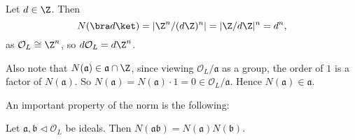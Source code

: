 \documentclass[a4paper]{article}
\begin{document}
\begin{eg}
  Let $d \in \Z$. Then
  \[
    N(\bra d\ket) = |\Z^n/(d\Z)^n| = |\Z/d\Z|^n = d^n,
  \]
  as $\mathcal{O}_L\cong \Z^n$, so $d\mathcal{O}_L = d\Z^n$.
\end{eg}
Also note that $N(\mathfrak{a}) \in \mathfrak{a} \cap \Z$, since viewing $\mathcal{O}_L/\mathfrak{a}$ as a group, the order of $1$ is a factor of $N(\mathfrak{a})$. So $N(\mathfrak{a}) = N(\mathfrak{a}) \cdot 1 = 0 \in \mathcal{O}_L/\mathfrak{a}$. Hence $N(\mathfrak{a}) \in \mathfrak{a}$.

An important property of the norm is the following:
\begin{prop}
  Let $\mathfrak{a}, \mathfrak{b} \lhd \mathcal{O}_L$ be ideals. Then $N(\mathfrak{a} \mathfrak{b}) = N(\mathfrak{a})N(\mathfrak{b})$.
\end{prop}
\end{document}
